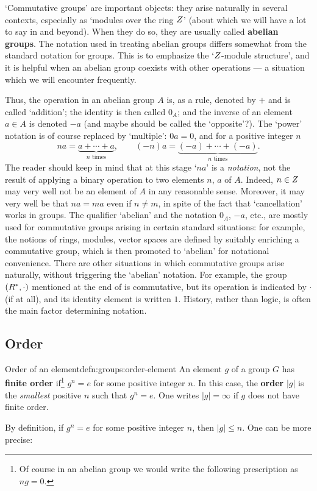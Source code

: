 `Commutative groups' are important objects: they arise naturally in
several contexts, especially as `modules over the ring $Z$' (about
which we will have a lot to say in  and beyond). When
they do so, they are usually called \textbf{abelian groups}.  The
notation used in treating abelian groups differs somewhat from the
standard notation for groups. This is to emphasize the `$Z$-module
structure', and it is helpful when an abelian group coexists with
other operations --- a situation which we will encounter frequently.

Thus, the operation in an abelian group $A$ is, as a rule, denoted by
$+$ and is called `addition'; the identity is then called $0_A$; and
the inverse of an element $a \in A$ is denoted $-a$ (and maybe should
be called the `opposite'?).  The `power' notation is of course
replaced by `multiple': $0a = 0$, and for a positive integer $n$
\[
  na = \underbrace{a + \cdots + a}_{n \text{ times}}, \qquad (-n)a =
  \underbrace{(-a) + \cdots + (-a)}_{n \text{ times}}.
\]
The reader should keep in mind that at this stage `$na$' is a
\emph{notation}, not the result of applying a binary operation to two
elements $n$, $a$ of $A$.  Indeed, $n \in Z$ may very well not be an
element of $A$ in any reasonable sense. Moreover, it may very well be
that $na = ma$ even if $n \neq m$, in spite of the fact that
`cancellation' works in groups.  The qualifier `abelian' and the
notation $0_A$, $-a$, etc., are mostly used for commutative groups
arising in certain standard situations: for example, the notions of
rings, modules, vector spaces are defined by suitably enriching a
commutative group, which is then promoted to `abelian' for notational
convenience.  There are other situations in which commutative groups
arise naturally, without triggering the `abelian' notation. For
example, the group $(R^*, \cdot)$ mentioned at the end of
 is commutative, but its operation
is indicated by $\cdot$ (if at all), and its identity element is
written $1$. History, rather than logic, is often the main factor
determining notation.

\subsection{Order}
\label{subsec:groups:order}

\begin{defn}{Order of an element}{defn:groups:order-element}
  An element $g$ of a group $G$ has \textbf{finite order}
  if\footnote{Of course in an abelian group we would write the
    following prescription as $ng = 0$.}  $g^n = e$ for some positive
  integer $n$. In this case, the \textbf{order} $|g|$ is the
  \emph{smallest} positive $n$ such that $g^n = e$. One writes
  $|g| = \infty$ if $g$ does not have finite order.
\end{defn}
By definition, if $g^n = e$ for some positive integer $n$, then
$|g| \leq n$.  One can be more precise:

